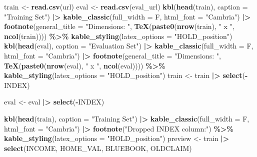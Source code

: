 \documentclass[
]{article}
\newenvironment{Shaded}{\begin{snugshade}}{\end{snugshade}}
\newcommand{\AttributeTok}[1]{\textcolor[rgb]{0.13,0.29,0.53}{#1}}
\newcommand{\FunctionTok}[1]{\textcolor[rgb]{0.13,0.29,0.53}{\textbf{#1}}}
\newcommand{\NormalTok}[1]{#1}
\newcommand{\OtherTok}[1]{\textcolor[rgb]{0.56,0.35,0.01}{#1}}
\newcommand{\SpecialCharTok}[1]{\textcolor[rgb]{0.81,0.36,0.00}{\textbf{#1}}}
\newcommand{\StringTok}[1]{\textcolor[rgb]{0.31,0.60,0.02}{#1}}
\begin{document}
\begin{Shaded}
\begin{Highlighting}[]
\NormalTok{train }\OtherTok{\textless{}{-}} \FunctionTok{read.csv}\NormalTok{(url)}
\NormalTok{eval }\OtherTok{\textless{}{-}} \FunctionTok{read.csv}\NormalTok{(eval\_url)}
\FunctionTok{kbl}\NormalTok{(}\FunctionTok{head}\NormalTok{(train), }\AttributeTok{caption =} \StringTok{"Training Set"}\NormalTok{) }\SpecialCharTok{|\textgreater{}}
  \FunctionTok{kable\_classic}\NormalTok{(}\AttributeTok{full\_width =}\NormalTok{ F, }\AttributeTok{html\_font =} \StringTok{"Cambria"}\NormalTok{) }\SpecialCharTok{|\textgreater{}}
  \FunctionTok{footnote}\NormalTok{(}\AttributeTok{general\_title =} \StringTok{"Dimensions: "}\NormalTok{,}
          \FunctionTok{TeX}\NormalTok{(}\FunctionTok{paste0}\NormalTok{(}\FunctionTok{nrow}\NormalTok{(train), }\StringTok{" x "}\NormalTok{, }\FunctionTok{ncol}\NormalTok{(train)))) }\SpecialCharTok{\%\textgreater{}\%}
  \FunctionTok{kable\_styling}\NormalTok{(}\AttributeTok{latex\_options =} \StringTok{"HOLD\_position"}\NormalTok{)}
\FunctionTok{kbl}\NormalTok{(}\FunctionTok{head}\NormalTok{(eval), }\AttributeTok{caption =} \StringTok{"Evaluation Set"}\NormalTok{) }\SpecialCharTok{|\textgreater{}}
  \FunctionTok{kable\_classic}\NormalTok{(}\AttributeTok{full\_width =}\NormalTok{ F, }\AttributeTok{html\_font =} \StringTok{"Cambria"}\NormalTok{) }\SpecialCharTok{|\textgreater{}}
  \FunctionTok{footnote}\NormalTok{(}\AttributeTok{general\_title =} \StringTok{"Dimensions: "}\NormalTok{,}
          \FunctionTok{TeX}\NormalTok{(}\FunctionTok{paste0}\NormalTok{(}\FunctionTok{nrow}\NormalTok{(eval), }\StringTok{" x "}\NormalTok{, }\FunctionTok{ncol}\NormalTok{(eval)))) }\SpecialCharTok{\%\textgreater{}\%}
  \FunctionTok{kable\_styling}\NormalTok{(}\AttributeTok{latex\_options =} \StringTok{"HOLD\_position"}\NormalTok{)}
\NormalTok{train }\OtherTok{\textless{}{-}} 
\NormalTok{  train }\SpecialCharTok{|\textgreater{}}
  \FunctionTok{select}\NormalTok{(}\SpecialCharTok{{-}}\NormalTok{INDEX)}

\NormalTok{eval }\OtherTok{\textless{}{-}} 
\NormalTok{  eval }\SpecialCharTok{|\textgreater{}}
  \FunctionTok{select}\NormalTok{(}\SpecialCharTok{{-}}\NormalTok{INDEX)}

\FunctionTok{kbl}\NormalTok{(}\FunctionTok{head}\NormalTok{(train), }\AttributeTok{caption =} \StringTok{"Training Set"}\NormalTok{) }\SpecialCharTok{|\textgreater{}}
  \FunctionTok{kable\_classic}\NormalTok{(}\AttributeTok{full\_width =}\NormalTok{ F, }\AttributeTok{html\_font =} \StringTok{"Cambria"}\NormalTok{) }\SpecialCharTok{|\textgreater{}}
  \FunctionTok{footnote}\NormalTok{(}\StringTok{"Dropped \textasciigrave{}INDEX\textasciigrave{} column:"}\NormalTok{) }\SpecialCharTok{\%\textgreater{}\%}
  \FunctionTok{kable\_styling}\NormalTok{(}\AttributeTok{latex\_options =} \StringTok{"HOLD\_position"}\NormalTok{)}
\NormalTok{preview }\OtherTok{\textless{}{-}}
\NormalTok{  train }\SpecialCharTok{|\textgreater{}}
  \FunctionTok{select}\NormalTok{(INCOME, HOME\_VAL, BLUEBOOK, OLDCLAIM)}


\end{Highlighting}
\end{Shaded}
\end{document}
